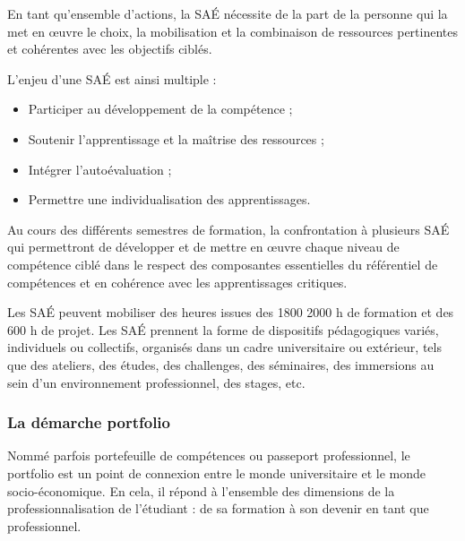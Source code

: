 \documentclass[10pt]{article}
\begin{document}
En tant qu’ensemble d’actions, la SAÉ nécessite de la part de la
personne qui la met en œuvre le choix, la mobilisation et la combinaison
de ressources pertinentes et cohérentes avec les objectifs ciblés.

L’enjeu d’une SAÉ est ainsi multiple :
\begin{itemize}
\item Participer au développement de la compétence ;
\item Soutenir l’apprentissage et la maîtrise des ressources ;
\item Intégrer l’autoévaluation ;
\item Permettre une individualisation des apprentissages.
\end{itemize}

Au cours des différents semestres de formation, la confrontation à
plusieurs SAÉ qui permettront de développer et de mettre en œuvre
chaque niveau de compétence ciblé dans le respect des composantes
essentielles du référentiel de compétences et en cohérence avec les
apprentissages critiques.

Les SAÉ peuvent mobiliser des heures issues des
1800
2000
h de formation et des 600 h de projet. Les SAÉ prennent la forme de
dispositifs pédagogiques variés, individuels ou collectifs, organisés
dans un cadre universitaire ou extérieur, tels que des ateliers, des
études, des challenges, des séminaires, des immersions au sein d’un
environnement professionnel, des stages, etc.

\subsubsection*{La démarche portfolio}%
\label{FICHE-\VAR{portfolio.getId()|le}}%

Nommé parfois portefeuille de compétences ou passeport professionnel, le
portfolio est un point de connexion entre le monde universitaire et le
monde socio-économique. En cela, il répond à l’ensemble des dimensions
de la professionnalisation de l’étudiant : de sa formation à son devenir
en tant que professionnel.
\end{document}

